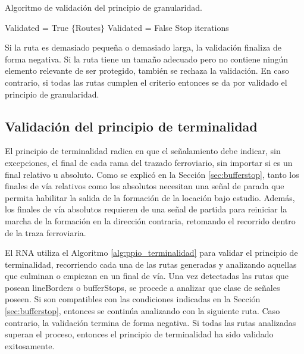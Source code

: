 		\begin{algorithm}[hbt!]
			\caption{Algoritmo de validación del principio de granularidad.}\label{alg:ppio_granularidad}
			\DontPrintSemicolon
			\SetNoFillComment
			\LinesNotNumbered 
			Validated = True\;
			$\{$Routes$\}$\; 
			{
				{
					Validated = False\; 
					Stop iterations\;
				}				
			}
		\end{algorithm}
		
		Si la ruta es demasiado pequeña o demasiado larga, la validación finaliza de forma negativa. Si la ruta tiene un tamaño adecuado pero no contiene ningún elemento relevante de ser protegido, también se rechaza la validación. En caso contrario, si todas las rutas cumplen el criterio entonces se da por validado el principio de granularidad.
		
	\subsection{Validación del principio de terminalidad}
		
		El principio de terminalidad radica en que el señalamiento debe indicar, sin excepciones, el final de cada rama del trazado ferroviario, sin importar si es un final relativo u absoluto. Como se explicó en la Sección \ref{sec:bufferstop}, tanto los finales de vía relativos como los absolutos necesitan una señal de parada que permita habilitar la salida de la formación de la locación bajo estudio. Además, los finales de vía absolutos requieren de una señal de partida para reiniciar la marcha de la formación en la dirección contraria, retomando el recorrido dentro de la traza ferroviaria.	
		
		El RNA utiliza el Algoritmo \ref{alg:ppio_terminalidad} para validar el principio de terminalidad, recorriendo cada una de las rutas generadas y analizando aquellas que culminan o empiezan en un final de vía. Una vez detectadas las rutas que posean lineBorders o bufferStops, se procede a analizar que clase de señales poseen. Si son compatibles con las condiciones indicadas en la Sección \ref{sec:bufferstop}, entonces se continúa analizando con la siguiente ruta. Caso contrario, la validación termina de forma negativa. Si todas las rutas analizadas superan el proceso, entonces el principio de terminalidad ha sido validado exitosamente.
		
